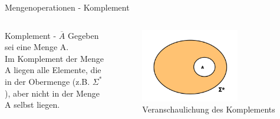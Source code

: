 \begin{frame}{Mengenoperationen - Komplement}
    \begin{columns}
    \begin{alertblock}{Komplement - $\overline{A}$}
    Gegeben sei eine Menge A.\\
    Im Komplement der Menge A liegen alle Elemente, die in der Obermenge (z.B. $\Sigma^{*}$), aber nicht in der Menge A selbst liegen.
    \end{alertblock}
\begin{figure}
    \centering
    \includegraphics[width=0.7\textwidth]{../figures/Akomp.png}
    \caption{Veranschaulichung des Komplements}
    \label{fig:my_label}
\end{figure}
\end{columns}
\end{frame}


